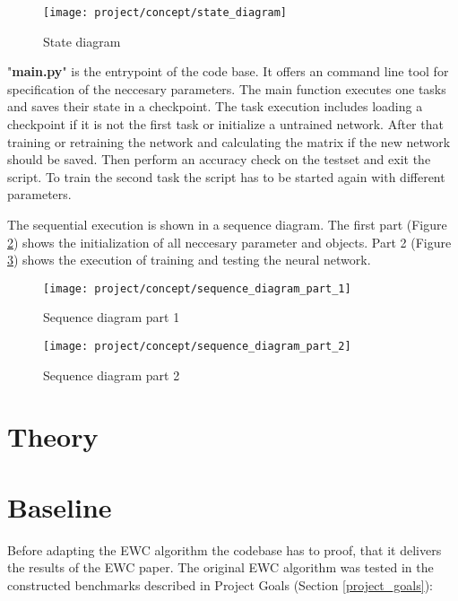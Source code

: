 \begin{figure}[H]
    \centering
    \texttt{[image: project/concept/state\_diagram]}
    \caption{State diagram}
    \label{fig:concept_state_diagram}
\end{figure}

"\textbf{main.py}" is the entrypoint of the code base.
It offers an command line tool for specification of the neccesary parameters.
\newline
The main function executes one tasks and saves their state in a checkpoint.
The task execution includes loading a checkpoint if it is not the first task or initialize a untrained network.
After that training or retraining the network and calculating the matrix if the new network should be saved.
Then perform an accuracy check on the testset and exit the script.
To train the second task the script has to be started again with different parameters.

The sequential execution is shown in a sequence diagram.
The first part (Figure \ref{fig:concept_sequence_diagram_part_1}) shows the initialization of all neccesary parameter and objects.
Part 2 (Figure \ref{fig:concept_sequence_diagram_part_2}) shows the execution of training and testing the neural network.

\begin{figure}[H]
    \centering
    \texttt{[image: project/concept/sequence\_diagram\_part\_1]}
    \caption{Sequence diagram part 1}
    \label{fig:concept_sequence_diagram_part_1}
\end{figure}

\begin{figure}[H]
    \centering
    \texttt{[image: project/concept/sequence\_diagram\_part\_2]}
    \caption{Sequence diagram part 2}
    \label{fig:concept_sequence_diagram_part_2}
\end{figure}

\section{Theory}
\newpage
\section{Baseline}

Before adapting the EWC algorithm the codebase has to proof, that it delivers the results of the EWC paper.
The original EWC algorithm was tested in the constructed benchmarks described in Project Goals (Section \ref{project_goals}):

